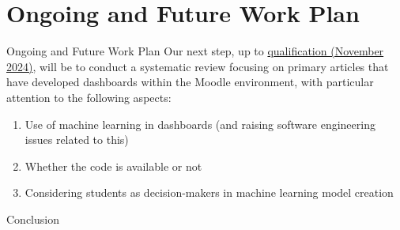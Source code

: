 \section{Ongoing and Future Work Plan}

\begin{frame}{Ongoing and Future Work Plan}
    Our next step, up to \underline{qualification (November 2024)}, will be to conduct a systematic review focusing on primary articles that have developed dashboards within the Moodle environment, with particular attention to the following aspects: 
    
    \begin{enumerate}[<alert@+>]\color{gray}
        \item Use of machine learning in dashboards (and raising software engineering issues related to this)
        \item Whether the code is available or not
        \item Considering students as decision-makers in machine learning model creation
    \end{enumerate}

\end{frame}

\begin{frame}{Conclusion}
\end{frame}
